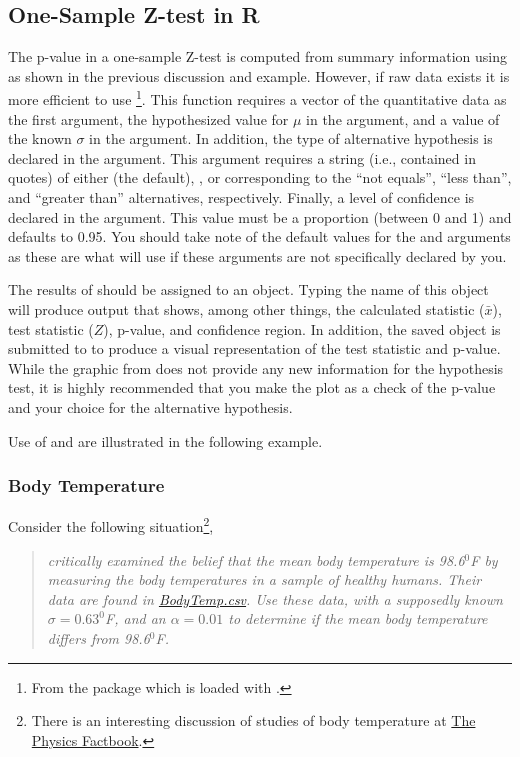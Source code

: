 \documentclass[10pt,openany]{book}\usepackage[]{graphicx}\usepackage[]{color}
\begin{document}
\subsection{One-Sample Z-test in R}
The p-value in a one-sample Z-test is computed from summary information using  as shown in the previous discussion and example.  However, if raw data exists it is more efficient to use \footnote{From the  package which is loaded with .}.  This function requires a vector of the quantitative data as the first argument, the hypothesized value for $\mu$ in the  argument, and a value of the known $\sigma$ in the  argument.  In addition, the type of alternative hypothesis is declared in the  argument.  This argument requires a string (i.e., contained in quotes) of either  (the default), , or  corresponding to the ``not equals'', ``less than'', and ``greater than'' alternatives, respectively.  Finally, a level of confidence is declared in the  argument.  This value must be a proportion (between 0 and 1) and defaults to 0.95.  You should take note of the default values for the  and  arguments as these are what  will use if these arguments are not specifically declared by you.

The results of  should be assigned to an object.  Typing the name of this object will produce output that shows, among other things, the calculated statistic ($\bar{x}$), test statistic ($Z$), p-value, and confidence region.  In addition, the saved object is submitted to  to produce a visual representation of the test statistic and p-value.  While the graphic from  does not provide any new information for the hypothesis test, it is highly recommended that you make the plot as a check of the p-value and your choice for the alternative hypothesis.

Use of  and  are illustrated in the following example.

\subsubsection{Body Temperature}
Consider the following situation\footnote{There is an interesting discussion of studies of body temperature at \href{http://hypertextbook.com/facts/LenaWong.shtml}{The Physics Factbook}.},
\begin{quote}
\textsl{\cite{Machowiaketal1992} critically examined the belief that the mean body temperature is 98.6$^{0}$F by measuring the body temperatures in a sample of healthy humans.  Their data are found in \href{https://raw.githubusercontent.com/droglenc/NCData/master/BodyTemp.csv}{BodyTemp.csv}.  Use these data, with a supposedly known $\sigma=0.63^{0}$F, and an $\alpha=0.01$ to determine if the mean body temperature differs from 98.6$^{0}$F.}
\end{quote}
\end{document}

